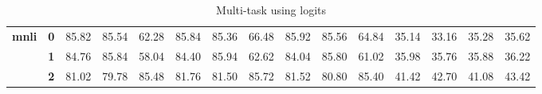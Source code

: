 \documentclass[11pt,a4paper]{article}
\begin{document}
\begin{table}
\begin{tabular}{lllllllllllllll}
		\hline
		\multirow{3}{*}{\textbf{mnli}}      & \textbf{0} & 85.82                          & 85.54                          & 62.28                          & 85.84                          & 85.36                          & 66.48                          & 85.92                          & 85.56                          & 64.84                          & 35.14                          & 33.16                          & 35.28                          & 35.62                              \\
		& \textbf{1} & 84.76                          & 85.84                          & 58.04                          & 84.40                          & 85.94                          & 62.62                          & 84.04                          & 85.80                          & 61.02                          & 35.98                          & 35.76                          & 35.88                          & 36.22                              \\
		& \textbf{2} & 81.02                          & 79.78                          & 85.48                          & 81.76                          & 81.50                          & 85.72                          & 81.52                          & 80.80                          & 85.40                          & 41.42                          & 42.70                          & 41.08                          & 43.42                             \\
		\bottomrule
	\end{tabular}
\caption{Multi-task using logits}\label{tab:multi-use-logits-full}
\end{table}
\end{document}
